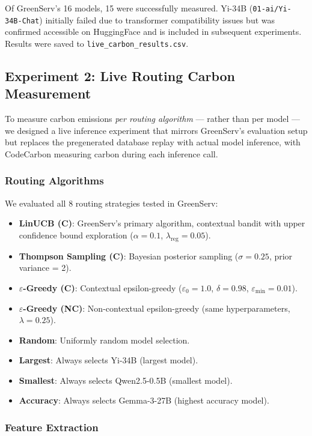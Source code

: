 \documentclass[12pt]{article}
\begin{document}
Of GreenServ's 16 models, 15 were successfully measured. Yi-34B
(\texttt{01-ai/Yi-34B-Chat}) initially failed due to transformer
compatibility issues but was confirmed accessible on HuggingFace and is
included in subsequent experiments. Results were saved to
\texttt{live\_carbon\_results.csv}.

\subsection{Experiment 2: Live Routing Carbon Measurement}
\label{sec:live}

To measure carbon emissions \textit{per routing algorithm} --- rather than
per model --- we designed a live inference experiment that mirrors
GreenServ's evaluation setup but replaces the pregenerated database replay
with actual model inference, with CodeCarbon measuring carbon during each
inference call.

\subsubsection{Routing Algorithms}

We evaluated all 8 routing strategies tested in GreenServ:
\begin{itemize}
  \item \textbf{LinUCB (C)}: GreenServ's primary algorithm, contextual
  bandit with upper confidence bound exploration ($\alpha = 0.1$,
  $\lambda_\text{reg} = 0.05$).
  \item \textbf{Thompson Sampling (C)}: Bayesian posterior sampling
  ($\sigma = 0.25$, prior variance = 2).
  \item \textbf{$\varepsilon$-Greedy (C)}: Contextual epsilon-greedy
  ($\varepsilon_0 = 1.0$, $\delta = 0.98$, $\varepsilon_\text{min} = 0.01$).
  \item \textbf{$\varepsilon$-Greedy (NC)}: Non-contextual epsilon-greedy
  (same hyperparameters, $\lambda = 0.25$).
  \item \textbf{Random}: Uniformly random model selection.
  \item \textbf{Largest}: Always selects Yi-34B (largest model).
  \item \textbf{Smallest}: Always selects Qwen2.5-0.5B (smallest model).
  \item \textbf{Accuracy}: Always selects Gemma-3-27B (highest accuracy
  model).
\end{itemize}

\subsubsection{Feature Extraction}
\end{document}
